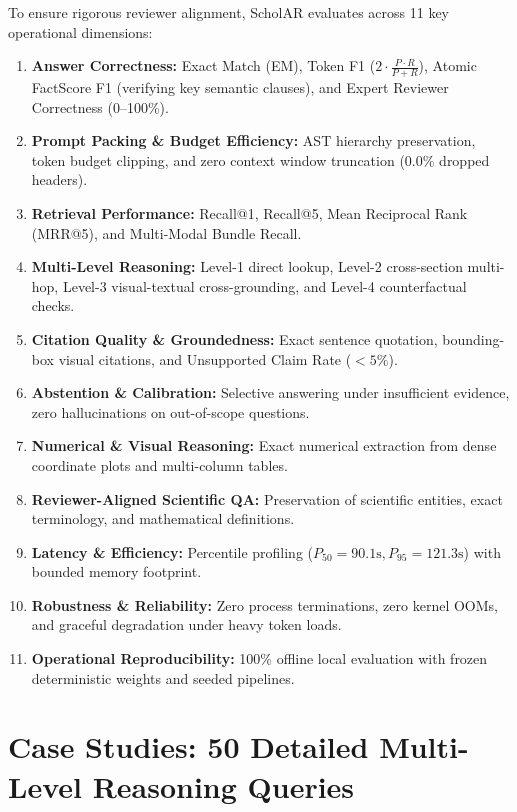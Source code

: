 \documentclass[10pt,a4paper]{article}
\begin{document}
To ensure rigorous reviewer alignment, ScholAR evaluates across 11 key operational dimensions:
\begin{enumerate}\setlength\itemsep{3pt}
    \item \textbf{Answer Correctness:} Exact Match (EM), Token F1 ($2 \cdot \frac{P \cdot R}{P + R}$), Atomic FactScore F1 (verifying key semantic clauses), and Expert Reviewer Correctness (0--100\%).
    \item \textbf{Prompt Packing \& Budget Efficiency:} AST hierarchy preservation, token budget clipping, and zero context window truncation ($0.0\%$ dropped headers).
    \item \textbf{Retrieval Performance:} Recall@1, Recall@5, Mean Reciprocal Rank (MRR@5), and Multi-Modal Bundle Recall.
    \item \textbf{Multi-Level Reasoning:} Level-1 direct lookup, Level-2 cross-section multi-hop, Level-3 visual-textual cross-grounding, and Level-4 counterfactual checks.
    \item \textbf{Citation Quality \& Groundedness:} Exact sentence quotation, bounding-box visual citations, and Unsupported Claim Rate ($< 5\%$).
    \item \textbf{Abstention \& Calibration:} Selective answering under insufficient evidence, zero hallucinations on out-of-scope questions.
    \item \textbf{Numerical \& Visual Reasoning:} Exact numerical extraction from dense coordinate plots and multi-column tables.
    \item \textbf{Reviewer-Aligned Scientific QA:} Preservation of scientific entities, exact terminology, and mathematical definitions.
    \item \textbf{Latency \& Efficiency:} Percentile profiling ($P_{50} = 90.1\text{s}, P_{95} = 121.3\text{s}$) with bounded memory footprint.
    \item \textbf{Robustness \& Reliability:} Zero process terminations, zero kernel OOMs, and graceful degradation under heavy token loads.
    \item \textbf{Operational Reproducibility:} 100\% offline local evaluation with frozen deterministic weights and seeded pipelines.
\end{enumerate}

\newpage
\section{Case Studies: 50 Detailed Multi-Level Reasoning Queries}
\end{document}
